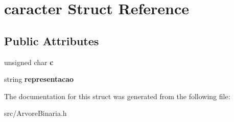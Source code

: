 \section{caracter Struct Reference}
\label{structcaracter}
\subsection*{Public Attributes}
\begin{DoxyCompactItemize}
\item 
unsigned char {\bfseries c}\label{structcaracter_a5bda935cece7d3513d2c3787a749844f}

\item 
string {\bfseries representacao}\label{structcaracter_a6e730c7b52e446b727e5a400538bec7a}

\end{DoxyCompactItemize}


The documentation for this struct was generated from the following file:\begin{DoxyCompactItemize}
\item 
src/ArvoreBinaria.h\end{DoxyCompactItemize}
